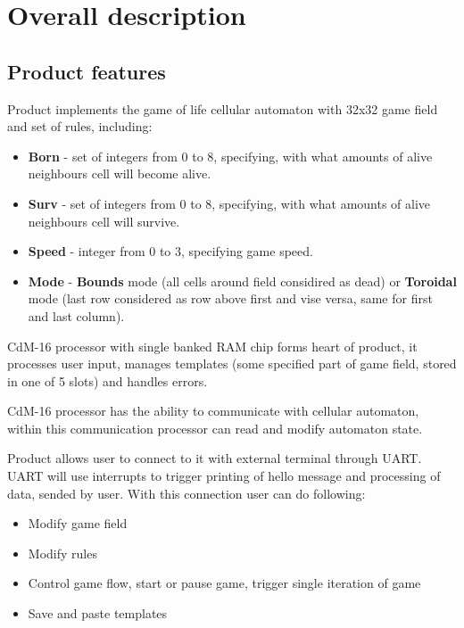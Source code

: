 \chapter*{Overall description}

\section*{Product features}

Product implements the game of life cellular automaton with 32x32 game field and set of rules, including:

\begin{itemize}
	\item \textbf{Born} - set of integers from 0 to 8, specifying, with what amounts of alive neighbours cell will become alive.
	\item \textbf{Surv} - set of integers from 0 to 8, specifying, with what amounts of alive neighbours cell will survive.
	\item \textbf{Speed} - integer from 0 to 3, specifying game speed.
	\item \textbf{Mode} - \textbf{Bounds} mode (all cells around field considired as dead) or \textbf{Toroidal} mode (last row considered as row above first and vise versa, same for first and last column).
\end{itemize}

CdM-16 processor with single banked RAM chip forms heart of product, it processes user input, manages templates (some specified part of game field, stored in one of 5 slots) and handles errors.

CdM-16 processor has the ability to communicate with cellular automaton, within this communication processor can read and modify automaton state.

Product allows user to connect to it with external terminal through UART. UART will use interrupts to trigger printing of hello message and processing of data, sended by user. With this connection user can do following:

\begin{itemize}
	\item Modify game field
	\item Modify rules
	\item Control game flow, start or pause game, trigger single iteration of game
	\item Save and paste templates
\end{itemize}

